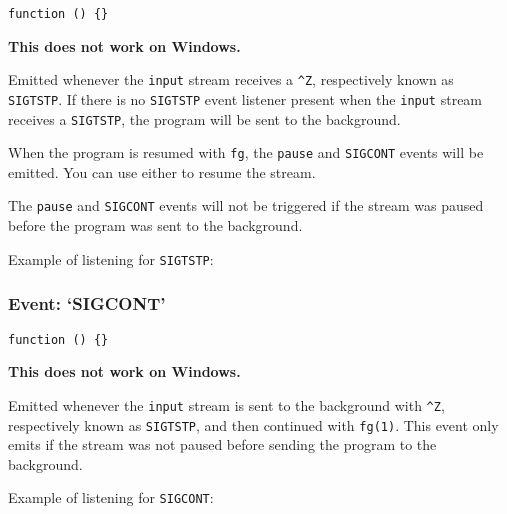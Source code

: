 \texttt{function () \{\}}

\textbf{This does not work on Windows.}

Emitted whenever the \texttt{input} stream receives a \texttt{\^{}Z},
respectively known as \texttt{SIGTSTP}. If there is no \texttt{SIGTSTP}
event listener present when the \texttt{input} stream receives a
\texttt{SIGTSTP}, the program will be sent to the background.

When the program is resumed with \texttt{fg}, the \texttt{pause} and
\texttt{SIGCONT} events will be emitted. You can use either to resume
the stream.

The \texttt{pause} and \texttt{SIGCONT} events will not be triggered if
the stream was paused before the program was sent to the background.

Example of listening for \texttt{SIGTSTP}:

\begin{Shaded}
\begin{Highlighting}[]
\NormalTok{(}\NormalTok{, }\NormalTok{() \{}
  \NormalTok{(}\NormalTok{);}
\NormalTok{\});}
\end{Highlighting}
\end{Shaded}

\subsubsection{Event: `SIGCONT'}\label{event-sigcont}

\texttt{function () \{\}}

\textbf{This does not work on Windows.}

Emitted whenever the \texttt{input} stream is sent to the background
with \texttt{\^{}Z}, respectively known as \texttt{SIGTSTP}, and then
continued with \texttt{fg(1)}. This event only emits if the stream was
not paused before sending the program to the background.

Example of listening for \texttt{SIGCONT}:

\begin{Shaded}
\begin{Highlighting}[]
\NormalTok{(}\NormalTok{, }\NormalTok{() \{}
  \NormalTok{();}
\NormalTok{\});}
\end{Highlighting}
\end{Shaded}

